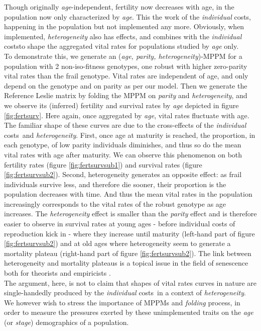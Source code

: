 \documentclass[10pt,a4paper]{article}
\newcommand{\PCoR}{\emph{individual} costs}
\begin{document}
Though originally \emph{age}-independent, fertility now decreases with age, in the population now only characterized by \emph{age}. This the work of the \PCoR, happening in the population but not implemented any more.
Obviously, when implemented, \emph{heterogeneity} also has effects, and combines with the \PCoR to shape the aggregated vital rates for populations studied by \emph{age} only. \\

To demonstrate this, we generate an (\emph{age, parity, heterogeneity})-MPPM for a population with 2 non-iso-fitness genotypes, one robust with higher zero-parity vital rates than the frail genotype. Vital rates are independent of age, and only depend on the genotype and on parity as per our model.
Then we generate the Reference Leslie matrix by folding the MPPM on \emph{parity} and \emph{heterogeneity}, and we observe its (inferred) fertility and survival rates by \emph{age} depicted in figure \ref{fig:fertsurv}.
Here again, once aggregated by \emph{age}, vital rates fluctuate with age. The familiar shape of these curves are due to the cross-effects of the \PCoR\ and \emph{heterogeneity}. First, once age at maturity is reached, the proportion, in each genotype, of low parity individuals diminishes, and thus so do the mean vital rates with age after maturity. We can observe this phenomenon on both fertility rates (figure \ref{fig:fertsurvsub1}) and survival rates (figure \ref{fig:fertsurvsub2}). Second, heterogeneity generates an opposite effect: as frail individuals survive less, and therefore die sooner, their proportion is the population decreases with time. And thus the mean vital rates in the population increasingly corresponds to the vital rates of the robust genotype as age increases. The \emph{heterogeneity} effect is smaller than the \emph{parity }effect and is therefore easier to observe in survival rates at young ages - before individual costs of reproduction kick in - where they increase until maturity (left-hand part of figure \ref{fig:fertsurvsub2}) and at old ages where heterogeneity seem to generate a mortality plateau (right-hand part of figure \ref{fig:fertsurvsub2}). The link between heterogeneity and mortality plateaus is a topical issue in the field of senescence both for theorists \citep{Charlesworth1997,Missov2015} and empiricists \citep{Drapeau2000,Vaupel1998b,Chen2013a}.\\ 
 
The argument, here, is not to claim that shapes of vital rates curves in nature are single-handedly produced by the \PCoR\ in a context of \emph{heterogeneity}.%
We however wish to stress the importance of MPPMs and \emph{folding} process, in order to measure the pressures exerted by these unimplemented traits on the \emph{age} (or \emph{stage}) demographics of a population.
\end{document}
